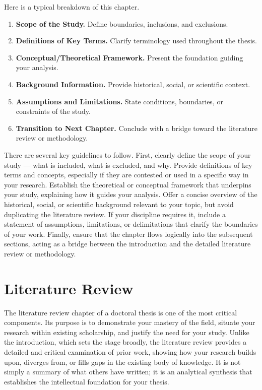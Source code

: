 \documentclass[PCOM,Thesis,Review]{mpThesis}
\newcommand{\Hd}[1]{{\color{SteelBlue}\bf#1.}}
\begin{document}
\begin{MainMatter}
\begin{Remark}
Here is a typical breakdown of this chapter.
\begin{enumerate}
\item \Hd{Scope of the Study}
Define boundaries, inclusions, and exclusions.

\item \Hd{Definitions of Key Terms}
Clarify terminology used throughout the thesis.

\item \Hd{Conceptual/Theoretical Framework}
Present the foundation guiding your analysis.

\item \Hd{Background Information}
Provide historical, social, or scientific context.

\item \Hd{Assumptions and Limitations}
State conditions, boundaries, or constraints of the study.

\item \Hd{Transition to Next Chapter}
Conclude with a bridge toward the literature review or methodology.
\end{enumerate}

There are several key guidelines to follow.
First, clearly define the scope of your study --- what is included, what is excluded, and why.
Provide definitions of key terms and concepts, especially if they are contested or used in a specific way in your research.
Establish the theoretical or conceptual framework that underpins your study, explaining how it guides your analysis.
Offer a concise overview of the historical, social, or scientific background relevant to your topic, but avoid duplicating the literature review.
If your discipline requires it, include a statement of assumptions, limitations, or delimitations that clarify the boundaries of your work.
Finally, ensure that the chapter flows logically into the subsequent sections, acting as a bridge between the introduction and the detailed literature review or methodology.
\end{Remark}

\chapter{Literature Review}
\label{ch:literature}
\minitoc

\begin{Remark}
The literature review chapter of a doctoral thesis is one of the most critical components.
Its purpose is to demonstrate your mastery of the field, situate your research within existing scholarship, and justify the need for your study.
Unlike the introduction, which sets the stage broadly, the literature review provides a detailed and critical examination of prior work,
showing how your research builds upon, diverges from, or fills gaps in the existing body of knowledge.
It is not simply a summary of what others have written; it is an analytical synthesis that establishes the intellectual foundation for your thesis.


\end{Remark}
\end{MainMatter}
\end{document}
